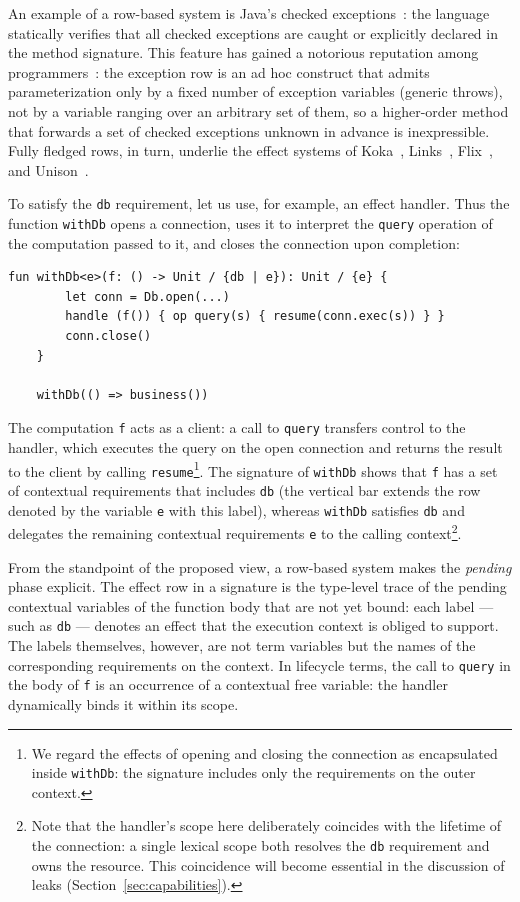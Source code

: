 \documentclass[11pt]{article}
\begin{document}
An example of a row-based system is Java's checked exceptions~\cite{gosling2000java}:
the language statically verifies that all checked exceptions are caught or explicitly
declared in the method signature. This feature has gained a notorious reputation among
programmers~\cite{checked-exceptions}: the exception row is an ad hoc construct that
admits parameterization only by a fixed number of exception variables (generic throws),
not by a variable ranging over an arbitrary set of them, so a higher-order method that
forwards a set of checked exceptions unknown in advance is inexpressible. Fully fledged
rows, in turn, underlie the effect systems of Koka~\cite{leijen2014koka},
Links~\cite{hillerstrom2016liberating}, Flix~\cite{madsen2020polymorphic}, and
Unison~\cite{unison-abilities}.

To satisfy the \lstinline|db| requirement, let us use, for example, an effect handler.
Thus the function \lstinline|withDb| opens a connection, uses it to interpret the
\lstinline|query| operation of the computation passed to it, and closes the connection
upon completion:
\begin{lstlisting}[language=colang]
    fun withDb<e>(f: () -> Unit / {db | e}): Unit / {e} {
        let conn = Db.open(...)
        handle (f()) { op query(s) { resume(conn.exec(s)) } }
        conn.close()
    }

    withDb(() => business())
\end{lstlisting}
The computation \lstinline|f| acts as a client: a call to \lstinline|query| transfers
control to the handler, which executes the query on the open connection and returns the
result to the client by calling \lstinline|resume|\footnote{We regard the effects of
opening and closing the connection as encapsulated inside \lstinline|withDb|: the
signature includes only the requirements on the outer context.}. The signature of
\lstinline|withDb| shows that \lstinline|f| has a set of contextual requirements that
includes \lstinline|db| (the vertical bar extends the row denoted by the variable
\lstinline|e| with this label), whereas \lstinline|withDb| satisfies \lstinline|db| and
delegates the remaining contextual requirements \lstinline|e| to the calling
context\footnote{Note that the handler's scope here deliberately coincides with the
lifetime of the connection: a single lexical scope both resolves the \lstinline|db|
requirement and owns the resource. This coincidence will become essential in the
discussion of leaks (Section~\ref{sec:capabilities}).}.

From the standpoint of the proposed view, a row-based system makes the \emph{pending}
phase explicit. The effect row in a signature is the type-level trace of the pending
contextual variables of the function body that are not yet bound: each label --- such
as \texttt{db} --- denotes an effect that the execution context is obliged to support.
The labels themselves, however, are not term variables but the names of the
corresponding requirements on the context. In lifecycle terms, the call to
\lstinline|query| in the body of \lstinline|f| is an occurrence of a contextual free
variable: the handler dynamically binds it within its scope.
\end{document}
